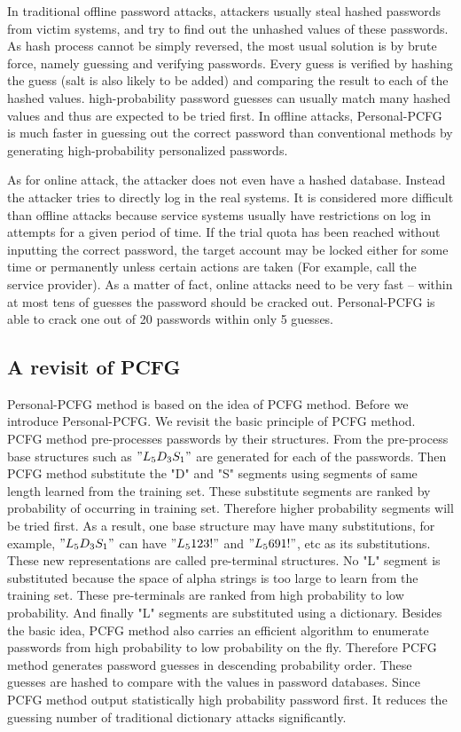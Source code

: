 In traditional offline password attacks, attackers usually steal hashed passwords from victim systems, and try to find out the unhashed values of these passwords. As hash process cannot be simply reversed, the most usual solution is by brute force, namely guessing and verifying passwords. Every guess is verified by hashing the guess (salt is also likely to be added) and comparing the result to each of the hashed values. high-probability password guesses can usually match many hashed values and thus are expected to be tried first. In offline attacks, Personal-PCFG is much faster in guessing out the correct password than conventional methods by generating high-probability personalized passwords.

As for online attack, the attacker does not even have a hashed database. Instead the attacker tries to directly log in the real systems. It is considered more difficult than offline attacks because service systems usually have restrictions on log in attempts for a given period of time. If the trial quota has been reached without inputting the correct password, the target account may be locked either for some time or permanently unless certain actions are taken (For example, call the service provider). As a matter of fact, online attacks need to be very fast -- within at most tens of guesses the password should be cracked out. Personal-PCFG is able to crack one out of 20 passwords within only 5 guesses. 

\subsection{A revisit of PCFG}
Personal-PCFG method is based on the idea of PCFG method. Before we introduce Personal-PCFG. We revisit the basic principle of PCFG method. PCFG method pre-processes passwords by their structures. From the pre-process base structures such as $"L_5D_3S_1"$ are generated for each of the passwords. Then PCFG method substitute the "D" and "S" segments using segments of same length learned from the training set. These substitute segments are ranked by probability of occurring in training set. Therefore higher probability segments will be tried first. As a result, one base structure may have many substitutions, for example, $"L_5D_3S_1"$ can have $"L_5123!"$ and $"L_5691!"$, etc as its substitutions. These new representations are called pre-terminal structures. No "L" segment is substituted because the space of alpha strings is too large to learn from the training set. These pre-terminals are ranked from high probability to low probability. And finally "L" segments are substituted using a dictionary. Besides the basic idea, PCFG method also carries an efficient algorithm to enumerate passwords from high probability to low probability on the fly. Therefore PCFG method generates password guesses in descending probability order. These guesses are hashed to compare with the values in password databases. Since PCFG method output statistically high probability password first. It reduces the guessing number of traditional dictionary attacks significantly. 

